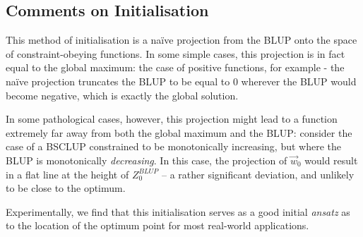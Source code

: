 			\subsection{Comments on Initialisation}

				This method of initialisation is a na\"ive projection from the BLUP onto the space of constraint-obeying functions. In some simple cases, this projection is in fact equal to the global maximum: the case of positive functions, for example - the na\"ive projection truncates the BLUP to be equal to 0 wherever the BLUP would become negative, which is exactly the global solution. 
				
				In some pathological cases, however, this projection might lead to a function extremely far away from both the global maximum and the BLUP: consider the case of a BSCLUP constrained to be monotonically increasing, but where the BLUP is monotonically \textit{decreasing}. In this case, the projection of $\vec{w}_0$ would result in a flat line at the height of $Z^{BLUP}_0$ -- a rather significant deviation, and unlikely to be close to the optimum.

				Experimentally, we find that this initialisation serves as a good initial \textit{ansatz} as to the location of the optimum point for most real-world applications.